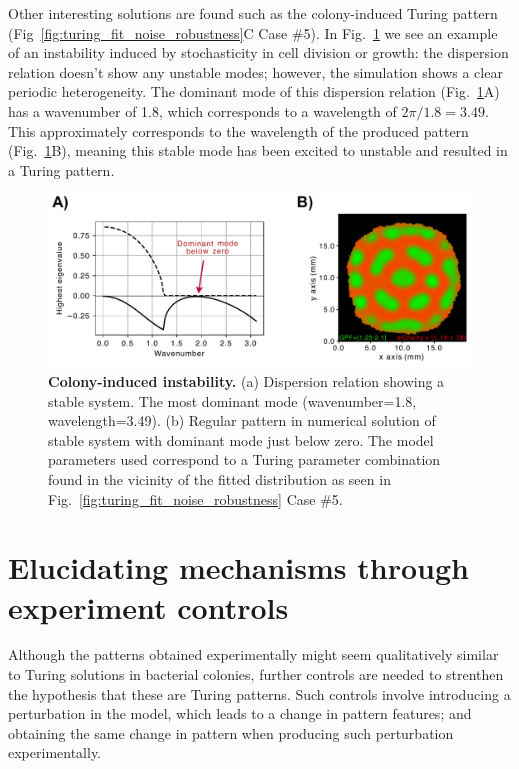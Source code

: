 Other interesting solutions are found such as the colony-induced Turing pattern (Fig~\ref{fig:turing_fit_noise_robustness}C Case \#5).
In Fig.~\ref{fig:colony_induced_turing} we see an example of an instability induced by stochasticity in cell division or growth: the dispersion relation doesn’t show any unstable modes; however, the simulation shows a clear periodic heterogeneity.
The dominant mode of this dispersion relation (Fig.~\ref{fig:colony_induced_turing}A) has a wavenumber of 1.8, which corresponds to a wavelength of $2\pi/1.8=3.49$.
This approximately corresponds to the wavelength of the produced pattern (Fig.~\ref{fig:colony_induced_turing}B), meaning this stable mode has been excited to unstable and resulted in a Turing pattern.


\begin{figure}[H] %
    \centering
    \begin{adjustbox}{center}
        \includegraphics[width=1\textwidth]{chapters/Chapter 3/colony_induced_turing} %
    \end{adjustbox}
    \caption{\textbf{Colony-induced instability.}  (a) Dispersion relation showing a stable system. The most dominant mode (wavenumber=1.8, wavelength=3.49). (b) Regular pattern in numerical solution of stable system with dominant mode just below zero. The model parameters used correspond to a Turing parameter combination found in the vicinity of the fitted distribution as seen in Fig.~\ref{fig:turing_fit_noise_robustness} Case \#5.}
    \label{fig:colony_induced_turing}
\end{figure}


\section{Elucidating mechanisms through experiment controls}
Although the patterns obtained experimentally might seem qualitatively similar to Turing solutions in bacterial colonies, further controls are needed to strenthen the hypothesis that these are Turing patterns.
Such controls involve introducing a perturbation in the model, which leads to a change in pattern features; and obtaining the same change in pattern when producing such perturbation experimentally.

